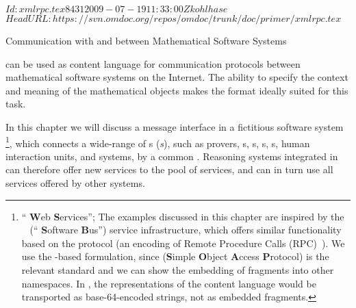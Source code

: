 \svnInfo $Id: xmlrpc.tex 8431 2009-07-19 11:33:00Z kohlhase $
\svnKeyword $HeadURL: https://svn.omdoc.org/repos/omdoc/trunk/doc/primer/xmlrpc.tex $

\begin{omgroup}[id=rpc,short=Communication between Systems]
                           {Communication with and between Mathematical Software Systems}

{\omdoc} can be used as content language for communication protocols between
mathematical software systems on the Internet. The ability to specify the context
and meaning of the mathematical objects makes the {\omdoc} format ideally suited
for this task.

In this chapter we will discuss a message interface in a fictitious software system
{\mathwebws}\footnote{``{\mathweb} {\bf{W}}eb {\bf{S}}ervices''; The examples discussed in
  this chapter are inspired by the {\mathwebsb}~\cite{FraKoh:mabdl99,ZimKoh:tmsbdmr02}
  (``{\mathweb} {\bf{S}}oftware {\bf{B}}us'') service infrastructure, which offers similar
  functionality based on the {\xmlrpc} protocol (an {\xml} encoding of Remote Procedure
  Calls (RPC)~\cite{xmlrpc}). We use the {\soap}-based formulation, since {\soap}
  ({\bf{S}}imple {\bf{O}}bject {\bf{A}}ccess {\bf{P}}rotocol) is the relevant
  {} standard and we can show the embedding of {\omdoc} fragments into other
  {\xml} namespaces. In {\xmlrpc}, the {\xml} representations of the content language
  {\omdoc} would be transported as base-64-encoded strings, not as embedded {\xml}
  fragments. }, which connects a wide-range of {s}
({\emph{s}}), such as {
  {prover}s}, {s}, {s}, {s}, {s},
human interaction units, and { {system}s}, by a
common {\emph{}}.  Reasoning systems integrated in
{\mathwebws} can therefore offer new services to the pool of services, and can in turn use
all services offered by other systems.


\end{omgroup}
